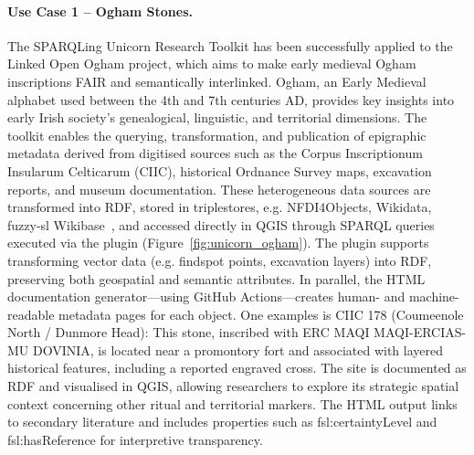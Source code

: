 \documentclass{eceasst}
\begin{document}
\paragraph{Use Case 1 – Ogham Stones.} The SPARQLing Unicorn Research Toolkit has been successfully applied to the Linked Open Ogham project, which aims to make early medieval Ogham inscriptions FAIR and semantically interlinked. Ogham, an Early Medieval alphabet used between the 4th and 7th centuries AD, provides key insights into early Irish society's genealogical, linguistic, and territorial dimensions. The toolkit enables the querying, transformation, and publication of epigraphic metadata derived from digitised sources such as the Corpus Inscriptionum Insularum Celticarum (CIIC), historical Ordnance Survey maps, excavation reports, and museum documentation. These heterogeneous data sources are transformed into RDF, stored in triplestores, e.g. NFDI4Objects, Wikidata, fuzzy-sl Wikibase~\cite{thiery_linked_2023}, and accessed directly in QGIS through SPARQL queries executed via the plugin (Figure~\ref{fig:unicorn_ogham}). The plugin supports transforming vector data (e.g. findspot points, excavation layers) into RDF, preserving both geospatial and semantic attributes. In parallel, the HTML documentation generator—using GitHub Actions—creates human- and machine-readable metadata pages for each object. One examples is CIIC 178 (Coumeenole North / Dunmore Head): This stone, inscribed with ERC MAQI MAQI-ERCIAS-MU DOVINIA, is located near a promontory fort and associated with layered historical features, including a reported engraved cross. The site is documented as RDF and visualised in QGIS, allowing researchers to explore its strategic spatial context concerning other ritual and territorial markers. The HTML output links to secondary literature and includes properties such as fsl:certaintyLevel and fsl:hasReference for interpretive transparency.
\end{document}
